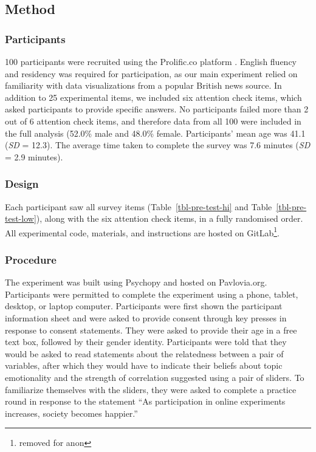 \documentclass[manuscript,screen,review]{acmart}
\begin{document}
\subsection{Method}\label{sec-method-pre}

\subsubsection{Participants}\label{sec-participants-pre}

100 participants were recruited using the Prolific.co platform
\citep{prolific}. English fluency and residency was required for
participation, as our main experiment relied on familiarity with data
visualizations from a popular British news source. In addition to 25
experimental items, we included six attention check items, which asked
participants to provide specific answers. No participants failed more
than 2 out of 6 attention check items, and therefore data from all 100
were included in the full analysis (52.0\% male and 48.0\% female.
Participants' mean age was 41.1 (\emph{SD} = 12.3). The average time
taken to complete the survey was 7.6 minutes (\emph{SD} = 2.9 minutes).

\subsubsection{Design}\label{sec-design-pre}

Each participant saw all survey items (Table~\ref{tbl-pre-test-hi} and
Table~\ref{tbl-pre-test-low}), along with the six attention check items,
in a fully randomised order. All experimental code, materials, and
instructions are hosted on GitLab\footnote{removed for anon}.

\subsubsection{Procedure}\label{sec-procedure-pre}

The experiment was built using Psychopy \citep{pierce_2019} and hosted
on Pavlovia.org. Participants were permitted to complete the experiment
using a phone, tablet, desktop, or laptop computer. Participants were
first shown the participant information sheet and were asked to provide
consent through key presses in response to consent statements. They were
asked to provide their age in a free text box, followed by their gender
identity. Participants were told that they would be asked to read
statements about the relatedness between a pair of variables, after
which they would have to indicate their beliefs about topic emotionality
and the strength of correlation suggested using a pair of sliders. To
familiarize themselves with the sliders, they were asked to complete a
practice round in response to the statement ``As participation in online
experiments increases, society becomes happier.''
\end{document}
